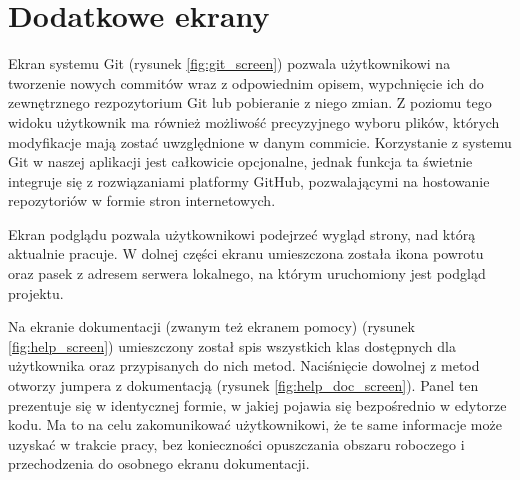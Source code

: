 \section{Dodatkowe ekrany}

Ekran systemu Git (rysunek \ref{fig:git_screen}) pozwala użytkownikowi na tworzenie nowych commitów wraz z odpowiednim opisem, wypchnięcie ich do zewnętrznego rezpozytorium Git lub pobieranie z niego zmian. Z poziomu tego widoku użytkownik ma również możliwość precyzyjnego wyboru plików, których modyfikacje mają zostać uwzględnione w danym commicie. Korzystanie z systemu Git w naszej aplikacji jest całkowicie opcjonalne, jednak funkcja ta świetnie integruje się z rozwiązaniami platformy GitHub, pozwalającymi na hostowanie repozytoriów w formie stron internetowych.

Ekran podglądu pozwala użytkownikowi podejrzeć wygląd strony, nad którą aktualnie pracuje. W dolnej części ekranu umieszczona została ikona powrotu oraz pasek z adresem serwera lokalnego, na którym uruchomiony jest podgląd projektu.

Na ekranie dokumentacji (zwanym też ekranem pomocy) (rysunek \ref{fig:help_screen}) umieszczony został spis wszystkich klas dostępnych dla użytkownika oraz przypisanych do nich metod. Naciśnięcie dowolnej z metod otworzy jumpera z dokumentacją (rysunek \ref{fig:help_doc_screen}). Panel ten prezentuje się w identycznej formie, w jakiej pojawia się bezpośrednio w edytorze kodu. Ma to na celu zakomunikować użytkownikowi, że te same informacje może uzyskać w trakcie pracy, bez konieczności opuszczania obszaru roboczego i przechodzenia do osobnego ekranu dokumentacji.
